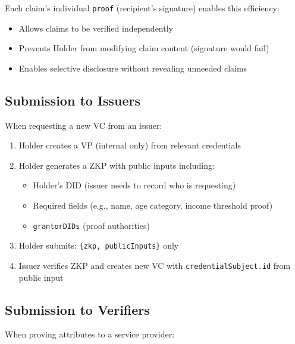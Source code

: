 Each claim's individual \texttt{proof} (recipient's signature) enables this efficiency:

\begin{itemize}
  \item Allows claims to be verified independently
  \item Prevents Holder from modifying claim content (signature would fail)
  \item Enables selective disclosure without revealing unneeded claims
\end{itemize}

\subsection{Submission to Issuers}

When requesting a new VC from an issuer:

\begin{enumerate}
  \item Holder creates a VP (internal only) from relevant credentials
  \item Holder generates a ZKP with public inputs including:
    \begin{itemize}
      \item Holder's DID (issuer needs to record who is requesting)
      \item Required fields (e.g., name, age category, income threshold proof)
      \item \texttt{grantorDIDs} (proof authorities)
    \end{itemize}
  \item Holder submits: \texttt{\{zkp, publicInputs\}} only
  \item Issuer verifies ZKP and creates new VC with \texttt{credentialSubject.id} from public input
\end{enumerate}

\subsection{Submission to Verifiers}

When proving attributes to a service provider:

